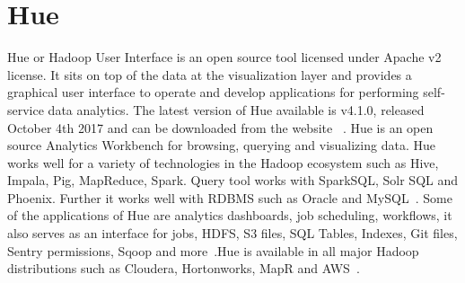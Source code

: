 \section{Hue}


Hue or Hadoop User Interface is an open source tool licensed 
under Apache v2 license. It sits on top of the data at the 
visualization layer and provides a graphical user interface to 
operate and develop applications for performing self-service 
data analytics.
The latest version of Hue available is v4.1.0, released October 
4th 2017 and can be downloaded from the website
~\cite{hid-sp18-517-hue-apache}. Hue is an open source Analytics
Workbench for browsing, querying and visualizing data. Hue works well
for a variety of technologies in the Hadoop ecosystem such as Hive,
Impala, Pig, MapReduce, Spark. Query tool works with SparkSQL, Solr SQL and Phoenix. Further it works 
well with RDBMS such as Oracle and
MySQL~\cite{hid-sp18-517-Hue-wiki}. Some of the applications of Hue are analytics dashboards, job scheduling, workflows, it also serves as an interface for jobs, HDFS, S3 files, SQL Tables, Indexes, Git files, Sentry permissions, Sqoop and more~\cite{hid-sp18-517-Hue-wiki}.Hue is available in all major Hadoop distributions such as Cloudera, 
Hortonworks, MapR and AWS~\cite{hid-sp18-517-Hue-wiki}.

